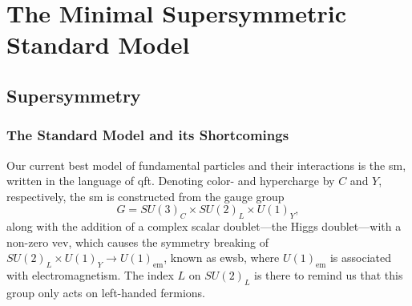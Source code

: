 \chapter{The Minimal Supersymmetric Standard Model}\label{ch:mssm}


\section{Supersymmetry}


\subsection{The Standard Model and its Shortcomings}\label{sec:standard_model}
Our current best model of fundamental particles and their interactions is the \gls{sm}, written in the language of \gls{qft}. Denoting color- and hypercharge by $C$ and $Y$, respectively, the \gls{sm} is constructed from the gauge group
\begin{equation}
    G=SU(3)_C \times SU(2)_L \times U(1)_Y,
    \label{eq:sm_gauge_group}
\end{equation}
along with the addition of a complex scalar doublet---the Higgs doublet---with a non-zero \gls{vev}, which causes the symmetry breaking of $SU(2)_L \times U(1)_Y \to U(1)_{\mathrm{em}}$, known as \gls{ewsb}, where $U(1)_{\mathrm{em}}$ is associated with electromagnetism.
The index $L$ on $SU(2)_L$ is there to remind us that this group only acts on left-handed fermions.


